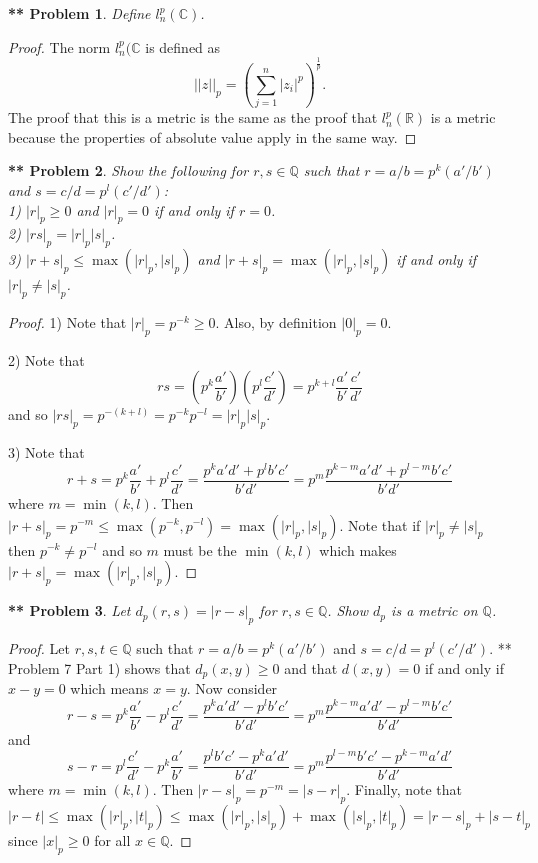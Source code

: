 \documentclass{article}
\newtheorem{**}{** Problem}
\begin{document}
\begin{flushleft}
\begin{**}
Define $l_n^p(\mathbb{C})$.
\end{**}
\begin{proof}
The norm $l_n^p(\mathbb{C}$ is defined as
\[
||z||_p = \left ( \sum_{j=1}^{n} |z_i|^p \right )^{\frac{1}{p}}.
\]
The proof that this is a metric is the same as the proof that $l_n^p(\mathbb{R})$ is a metric because the properties of absolute value apply in the same way.
\end{proof}

\begin{**}
Show the following for $r, s \in \mathbb{Q}$ such that $r = a/b = p^k(a'/b')$ and $s = c/d = p^l(c'/d')$:\\
1) $|r|_p \geq 0$ and $|r|_p = 0$ if and only if $r = 0$.\\
2) $|rs|_p = |r|_p |s|_p$.\\
3) $|r+s|_p \leq \max (|r|_p, |s|_p)$ and $|r+s|_p = \max(|r|_p, |s|_p)$ if and only if $|r|_p \neq |s|_p$.
\end{**}
\begin{proof}
1) Note that $|r|_p = p^{-k} \geq 0$. Also, by definition $|0|_p = 0$.\newline

2) Note that
\[
rs = \left ( p^k \frac{a'}{b'} \right ) \left ( p^l \frac{c'}{d'} \right ) = p^{k+l} \frac{a'}{b'} \frac{c'}{d'}
\]
and so $|rs|_p = p^{-(k+l)} = p^{-k}p^{-l} = |r|_p |s|_p$.\newline

3) Note that
\[
r+s = p^k \frac{a'}{b'} + p^l \frac{c'}{d'} = \frac{p^ka'd' + p^lb'c'}{b'd'} = p^m \frac{p^{k-m}a'd' + p^{l-m}b'c'}{b'd'}
\]
where $m = \min (k, l)$. Then $|r+s|_p = p^{-m} \leq \max (p^{-k}, p^{-l}) = \max (|r|_p, |s|_p)$. Note that if $|r|_p \neq |s|_p$ then $p^{-k} \neq p^{-l}$ and so $m$ must be the $\min (k, l)$ which makes $|r+s|_p = \max (|r|_p, |s|_p)$.
\end{proof}

\begin{**}
Let $d_p(r, s) = |r-s|_p$ for $r,s \in \mathbb{Q}$. Show $d_p$ is a metric on $\mathbb{Q}$.
\end{**}
\begin{proof}
Let $r,s,t \in \mathbb{Q}$ such that $r = a/b = p^k(a'/b')$ and $s = c/d = p^l(c'/d')$. ** Problem 7 Part 1) shows that $d_p(x,y) \geq 0$ and that $d(x,y) = 0$ if and only if $x-y = 0$ which means $x = y$. Now consider
\[
r-s = p^k \frac{a'}{b'} - p^l \frac{c'}{d'} = \frac{p^ka'd' - p^lb'c'}{b'd'} = p^m \frac{p^{k-m}a'd' - p^{l-m}b'c'}{b'd'}
\]
and
\[
s-r = p^l \frac{c'}{d'} - p^k \frac{a'}{b'} = \frac{p^lb'c' - p^ka'd'}{b'd'} = p^m \frac{p^{l-m}b'c' - p^{k-m}a'd'}{b'd'}
\]
where $m = \min (k, l)$. Then $|r-s|_p = p^{-m} = |s-r|_p$. Finally, note that
\[
|r-t| \leq \max (|r|_p, |t|_p) \leq \max (|r|_p, |s|_p) + \max (|s|_p, |t|_p) = |r-s|_p + |s-t|_p
\]
since $|x|_p \geq 0$ for all $x \in \mathbb{Q}$.
\end{proof}

\end{flushleft}
\end{document}
